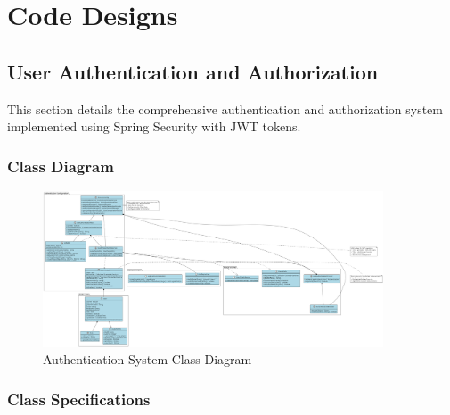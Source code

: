 \documentclass[12pt,a4paper]{article}
\begin{document}
\section{Code Designs}

\subsection{User Authentication and Authorization}

This section details the comprehensive authentication and authorization system implemented using Spring Security with JWT tokens.

\subsubsection{Class Diagram}

\begin{figure}[H]
\centering
\includegraphics[width=0.9\textwidth]{diagrams/authentication_class_diagram.png}
\caption{Authentication System Class Diagram}
\label{fig:auth-class-diagram}
\end{figure}

\subsubsection{Class Specifications}
\end{document}
